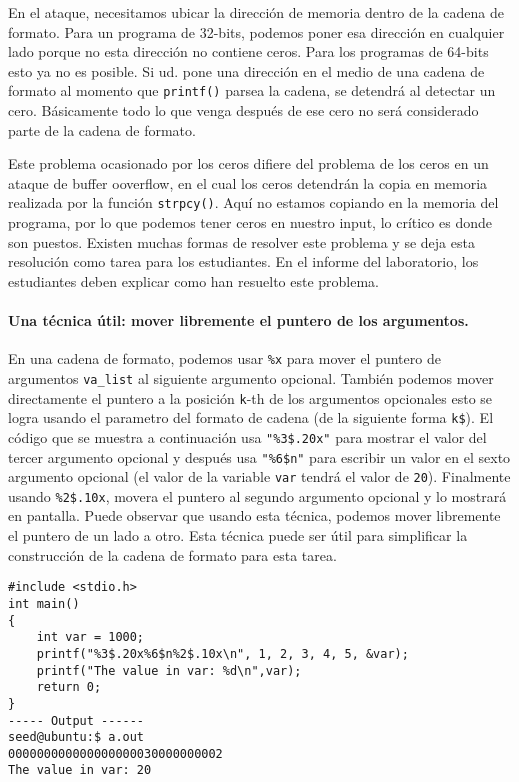 En el ataque, necesitamos ubicar la dirección de memoria dentro de la cadena de formato. Para un programa de 32-bits, podemos poner esa dirección en cualquier lado porque no esta dirección no contiene ceros. Para los programas de 64-bits esto ya no es posible. Si ud. pone una dirección en el medio de una cadena de formato al momento que \texttt{printf()} parsea la cadena, se detendrá al detectar un cero. Básicamente todo lo que venga después de ese cero no será considerado parte de la cadena de formato.

Este problema ocasionado por los ceros difiere del problema de los ceros en un ataque de buffer ooverflow, en el cual los ceros detendrán la copia en memoria realizada por la función \texttt{strpcy()}.
Aquí no estamos copiando en la memoria del programa, por lo que podemos tener ceros en nuestro input, lo crítico es donde son puestos.
Existen muchas formas de resolver este problema y se deja esta resolución como tarea para los estudiantes. En el informe del laboratorio, los estudiantes deben explicar como han resuelto este problema.


\paragraph{Una técnica útil: mover libremente el puntero de los argumentos.}
En una cadena de formato, podemos usar \texttt{\%x} para mover el puntero de argumentos \texttt{va\_list} al siguiente argumento opcional.
También podemos mover directamente el puntero a la posición \texttt{k}-th de los argumentos opcionales esto se logra usando el parametro del formato de cadena (de la siguiente forma \texttt{k\$}).
El código que se muestra a continuación usa \texttt{"\%3\$.20x"} para mostrar el valor del tercer argumento opcional y después usa \texttt{"\%6\$n"} para escribir un valor en el sexto argumento opcional (el valor de la variable \texttt{var} tendrá el valor de \texttt{20}). Finalmente usando \texttt{\%2\$.10x}, movera el puntero al segundo argumento opcional y lo mostrará en pantalla. Puede observar que usando esta técnica, podemos mover libremente el puntero de un lado a otro.
Esta técnica puede ser útil para simplificar la construcción de la cadena de formato para esta tarea.

\begin{lstlisting}
#include <stdio.h>
int main()
{
    int var = 1000;
    printf("%3$.20x%6$n%2$.10x\n", 1, 2, 3, 4, 5, &var);
    printf("The value in var: %d\n",var);
    return 0;
}
----- Output ------
seed@ubuntu:$ a.out
000000000000000000030000000002
The value in var: 20
\end{lstlisting}





